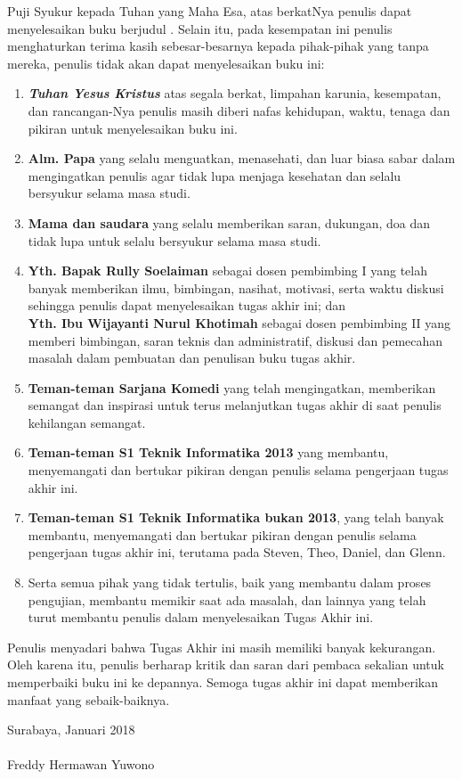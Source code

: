     
	  Puji Syukur kepada Tuhan yang Maha Esa, atas berkatNya penulis dapat menyelesaikan buku berjudul \textbf{\judul}. 
	  \newline
	  \indent Selain itu, pada kesempatan ini penulis menghaturkan terima kasih sebesar-besarnya kepada pihak-pihak yang tanpa mereka, penulis tidak akan dapat menyelesaikan buku ini:
  \begin{enumerate}
  	\item \textbf{\textit{Tuhan Yesus Kristus}} atas segala berkat, limpahan karunia, kesempatan, dan rancangan-Nya penulis masih diberi nafas kehidupan, waktu, tenaga dan pikiran untuk menyelesaikan buku ini.
    \item \textbf{Alm. Papa} yang selalu menguatkan, menasehati, dan luar biasa sabar dalam mengingatkan penulis agar tidak lupa menjaga kesehatan dan selalu bersyukur selama masa studi.
    \item \textbf{Mama dan saudara} yang selalu memberikan saran, dukungan, doa dan tidak lupa untuk selalu bersyukur selama masa studi.
    \item \textbf{Yth. Bapak Rully Soelaiman} sebagai dosen pembimbing I yang telah banyak memberikan ilmu, bimbingan, nasihat, motivasi, serta waktu diskusi sehingga penulis dapat menyelesaikan tugas akhir ini; dan \\
	    \textbf{Yth. Ibu Wijayanti Nurul Khotimah} sebagai dosen pembimbing II yang memberi bimbingan, saran teknis dan administratif, diskusi dan pemecahan masalah dalam pembuatan dan penulisan buku tugas akhir.
    \item \textbf{Teman-teman Sarjana Komedi} yang telah mengingatkan, memberikan semangat dan inspirasi untuk terus melanjutkan tugas akhir di saat penulis kehilangan semangat.
    \item \textbf{Teman-teman S1 Teknik Informatika 2013} yang membantu, menyemangati dan bertukar pikiran dengan  penulis selama pengerjaan tugas akhir ini.
    \item \textbf{Teman-teman S1 Teknik Informatika bukan 2013}, yang telah banyak membantu, menyemangati dan bertukar pikiran dengan penulis selama pengerjaan tugas akhir ini, terutama pada Steven, Theo, Daniel, dan Glenn.
    \item Serta semua pihak yang tidak tertulis, baik yang membantu dalam proses pengujian, membantu memikir saat ada masalah, dan lainnya yang telah turut membantu penulis dalam menyelesaikan Tugas Akhir ini.
  \end{enumerate}
  
  \indent Penulis menyadari bahwa Tugas Akhir ini masih memiliki banyak kekurangan. Oleh karena itu, penulis berharap kritik dan saran dari pembaca sekalian untuk memperbaiki buku ini ke depannya. Semoga tugas akhir ini dapat memberikan manfaat yang sebaik-baiknya.

  \hfill Surabaya, Januari 2018 \\ \\ 


  \hfill Freddy Hermawan Yuwono

\cleardoublepage %

